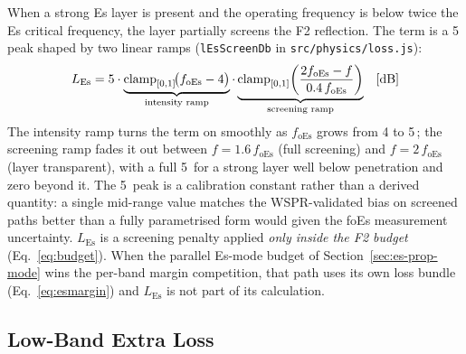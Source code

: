 \documentclass[11pt,a4paper]{article}
\newcommand{\SI}[2]{#1\,\text{#2}}
\newcommand{\si}[1]{\text{#1}}
\newcommand{\dB}{\text{dB}}
\newcommand{\MHz}{\text{MHz}}
\begin{document}
When a strong Es layer is present and the operating frequency is
below twice the Es critical frequency, the layer partially screens
the F2 reflection.  The term is a \SI{5}{\dB} peak shaped by two
linear ramps (\texttt{lEsScreenDb} in
\texttt{src/physics/loss.js}):
\begin{equation}
  L_{\text{Es}} = 5 \cdot
    \underbrace{\mathrm{clamp}_{[0,1]}\!\bigl(f_{\text{oEs}} - 4\bigr)}_{\text{intensity ramp}}
    \cdot
    \underbrace{\mathrm{clamp}_{[0,1]}\!\left(
      \frac{2 f_{\text{oEs}} - f}{0.4\, f_{\text{oEs}}}\right)}_{\text{screening ramp}}
    \quad [\si{\dB}]
\end{equation}
The intensity ramp turns the term on smoothly as $f_{\text{oEs}}$
grows from 4 to \SI{5}{\MHz}; the screening ramp fades it out
between $f = 1.6\,f_{\text{oEs}}$ (full screening) and $f =
2\,f_{\text{oEs}}$ (layer transparent), with a full \SI{5}{\dB}
for a strong layer well below
penetration and zero beyond it.  The \SI{5}{\dB} peak is a
calibration constant rather than
a derived quantity: a single mid-range value matches
the WSPR-validated bias on screened paths better than a fully
parametrised form would given the foEs measurement uncertainty.
$L_{\text{Es}}$ is a screening penalty applied \emph{only inside
the F2 budget} (Eq.~\ref{eq:budget}). When the parallel Es-mode budget
of Section~\ref{sec:es-prop-mode} wins the per-band margin
competition, that path uses its own loss bundle (Eq.~\ref{eq:esmargin})
and $L_{\text{Es}}$ is not part of its calculation.

\subsection{Low-Band Extra Loss}\label{sec:llow}
\end{document}

